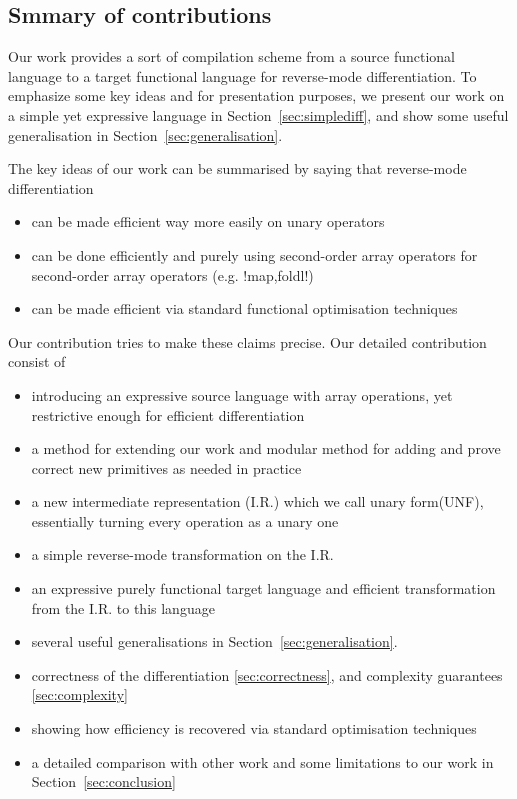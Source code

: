 \subsection{Smmary of contributions}

Our work provides a sort of compilation scheme from a source functional language to a target functional language for reverse-mode differentiation.
To emphasize some key ideas and for presentation purposes, we present our work on a simple yet expressive language in Section~\ref{sec:simplediff}, 
and show some useful generalisation in Section~\ref{sec:generalisation}. 

The key ideas of our work can be summarised by saying that reverse-mode differentiation
\begin{itemize}
   \item can be made efficient way more easily on unary operators
   \item can be done efficiently and purely using second-order array operators for second-order array operators (e.g. !map,foldl!) 
   \item can be made efficient via standard functional optimisation techniques
\end{itemize}

Our contribution tries to make these claims precise. Our detailed  contribution consist of
\begin{itemize}
    \item introducing an expressive source language with array operations, yet restrictive enough for efficient differentiation
    \item a method for extending our work and modular method for adding and prove correct new primitives as needed in practice 
    \item a new intermediate representation (I.R.) which we call unary form(UNF), essentially turning every operation as a unary one
    \item a simple reverse-mode transformation on the I.R.
    \item an expressive purely functional target language and efficient transformation from the I.R. to this language
    \item several useful generalisations in Section~\ref{sec:generalisation}. 
    \item correctness of the differentiation \ref{sec:correctness}, and complexity guarantees \ref{sec:complexity}
    \item showing how efficiency  is recovered via standard optimisation techniques
    \item a detailed comparison with other work and some limitations to our work in Section~\ref{sec:conclusion}
\end{itemize}

